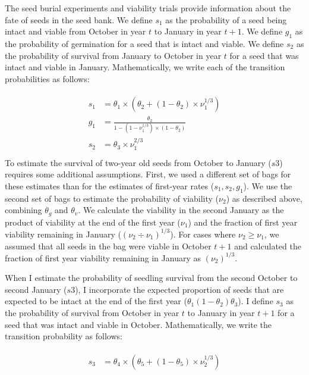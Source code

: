 \documentclass[12pt, oneside, titlepage]{article}   	%
\begin{document}
The seed burial experiments and viability trials provide information about the fate of seeds in the seed bank. We define $s_1$ as the probability of a seed being intact and viable from October in year $t$ to January in year $t+1$. We define $g_1$ as the probability of germination for a seed that is intact and viable. We define $s_2$ as the probability of survival from January to October in year $t$ for a seed that was intact and viable in January.  Mathematically, we write each of the transition probabilities as follows:

    \begin{align}
\begin{split}
s_1 & = \theta_1 \times (\theta_2 + ( 1- \theta_2 ) \times \nu_1^{1/3} ) \\
g_1 & = \frac{\theta_2 }{1 - ( 1-  \nu_1^{1/3} ) \times ( 1 - \theta_2 )} \\
s_2 & = \theta_3 \times \nu_1^{2/3} \\
  \end{split}
\end{align}
%
To estimate the survival of two-year old seeds from October to January ($s3$) requires some additional assumptions. First, we used a different set of bags for these estimates than for the estimates of first-year rates ($s_1, s_2, g_1$). We use the second set of bags to estimate the probability of viability ($\nu_2$) as described above, combining $\theta_g$ and $\theta_v$. We calculate the viability in the second January as the product of viability at the end of the first year ($\nu_1$) and the fraction of first year viability remaining in January ($ (\nu_2 \div \nu_1)^{1/3} $). For cases where $\nu_2 \geq \nu_1$, we assumed that all seeds in the bag were viable in October $t+1$ and calculated the fraction of first year viability remaining in January as $ (\nu_2 )^{1/3} $.

When I estimate the probability of seedling survival from the second October to second January ($s3$), I incorporate the expected proportion of seeds that are expected to be intact at the end of the first year ($\theta_1(1-\theta_2) \theta_3$). I define $s_3$ as the probability of survival from October in year $t$ to January in year $t+1$ for a seed that was intact and viable in October. Mathematically, we write the transition probability as follows:

    \begin{align}
\begin{split}
s_3 & = \theta_4 \times (\theta_5 + ( 1- \theta_5 ) \times \nu_2^{1/3} )
  \end{split}
\end{align}
%
\end{document}

